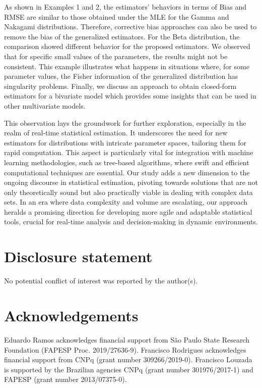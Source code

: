 \documentclass[lineno]{biometrika}
\begin{document}
As shown in Examples 1 and 2, the estimators' behaviors in terms of Bias and RMSE are similar to those obtained under the MLE for the Gamma and Nakagami distributions. Therefore, corrective bias approaches can also be used to remove the bias of the generalized estimators. For the Beta distribution, the comparison showed different behavior for the proposed estimators. We observed that for specific small values of the parameters, the results might not be consistent. This example illustrates what happens in situations where, for some parameter values, the Fisher information of the generalized distribution has singularity problems. Finally, we discuss an approach to obtain closed-form estimators for a bivariate model which provides some insights that can be used in other multivariate models.



This observation lays the groundwork for further exploration, especially in the realm of real-time statistical estimation. It underscores the need for new estimators for distributions with intricate parameter spaces, tailoring them for rapid computation. This aspect is particularly vital for integration with machine learning methodologies, such as tree-based algorithms, where swift and efficient computational techniques are essential. Our study adds a new dimension to the ongoing discourse in statistical estimation, pivoting towards solutions that are not only theoretically sound but also practically viable in dealing with complex data sets. In an era where data complexity and volume are escalating, our approach heralds a promising direction for developing more agile and adaptable statistical tools, crucial for real-time analysis and decision-making in dynamic environments.

\section*{Disclosure statement}

No potential conflict of interest was reported by the author(s).


\section*{Acknowledgements}

 Eduardo Ramos acknowledges financial support from S\~ao Paulo State Research Foundation (FAPESP Proc. 2019/27636-9). Francisco Rodrigues acknowledges financial support from CNPq (grant number 309266/2019-0). Francisco Louzada is supported by the Brazilian agencies CNPq (grant number
301976/2017-1) and FAPESP (grant number 2013/07375-0).
\end{document}
